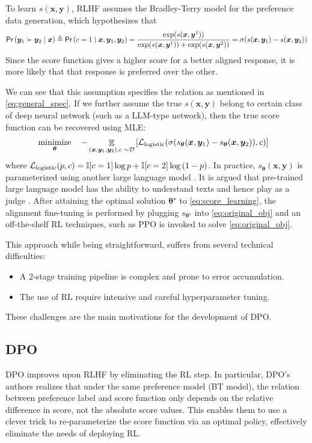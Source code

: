 \documentclass[11pt,a4paper]{article}
\begin{document}
To learn $s(\bm{x}, \bm{y})$, RLHF assumes the Bradley-Terry model \cite{} for the preference data generation, which hypothesizes that
\begin{equation}
\label{eq:bt_model}
\textsf{Pr}\left(\bm{y}_1 \succ \bm{y}_2 \mid \bm{x}\right) \triangleq \textsf{Pr}\left(c=1 \mid \bm{x}, \bm{y}_{1}, \bm{y}_{2}\right) = \dfrac{\exp(s(\bm{x}, \bm{y}^{1}))}{\exp(s(\bm{x}, \bm{y}^{1})) + \exp(s(\bm{x}, \bm{y}^{2}))}
= \sigma(s(\bm{x}, \bm{y}_{1}) - s(\bm{x}, \bm{y}_{2}))
\end{equation} 
Since the score function gives a higher score for a better aligned response, it is more likely that that response is preferred over the other.

We can see that this assumption specifies the relation as mentioned in \eqref{eq:general_spec}.
If we further assume the true $s(\bm{x}, \bm{y})$ belong to certain class of deep neural network (such as a LLM-type network), then the true score function can be recovered using MLE:
\begin{align}
\label{eq:score_learning}
& \operatorname*{\text{minimize}}_{\boldsymbol \theta} \quad -\mathop{\mathbb{E}}_{(\bm{x}, \bm{y}_1, \bm{y}_2), c \; \sim \mathcal{D}} \left[\mathcal{L}_{\rm logistic}(\sigma(s_{\boldsymbol \theta}(\bm{x}, \bm{y}_1) - s_{\boldsymbol \theta}(\bm{x}, \bm{y}_2)), c)\right]
\end{align}
where
$ \mathcal{L}_{\rm logistic}(p, c) = \mathbb{I}[c=1] \log p + \mathbb{I}[c=2] \log \left( 1-p\right)$.  In practice, $s_{\boldsymbol \theta}(\bm{x}, \bm{y})$ is parameterized using another large language model \cite{}. It is argued that pre-trained large language model has the ability to understand texts and hence play as a judge \cite{}.
After attaining the optimal solution $\boldsymbol \theta^{\star }$ to \eqref{eq:score_learning}, the alignment fine-tuning is performed by plugging $s_{\boldsymbol \theta^{\star }}$ into \eqref{eq:original_obj} and an off-the-shelf RL techniques, such as PPO \citep{schulman2017proximal} is invoked to solve \eqref{eq:original_obj}.

This approach while being straightforward, suffers from several technical difficulties: 
\begin{itemize}
    \item A 2-stage training pipeline is complex and prone to error accumulation.
    \item The use of RL require intensive and careful hyperparameter tuning.
\end{itemize}
These challenges are the main motivations for the development of DPO.
\subsection{DPO}%
\label{sub:dpo}
DPO improves upon RLHF by eliminating the RL step. In particular, DPO's authors realizes that under the same preference model (BT model), the relation between preference label and score function only depends on the relative difference in score, not the absolute score values. This enables them to use a clever trick to re-parameterize the score function via an optimal policy, effectively eliminate the needs of deploying RL.
\end{document}
